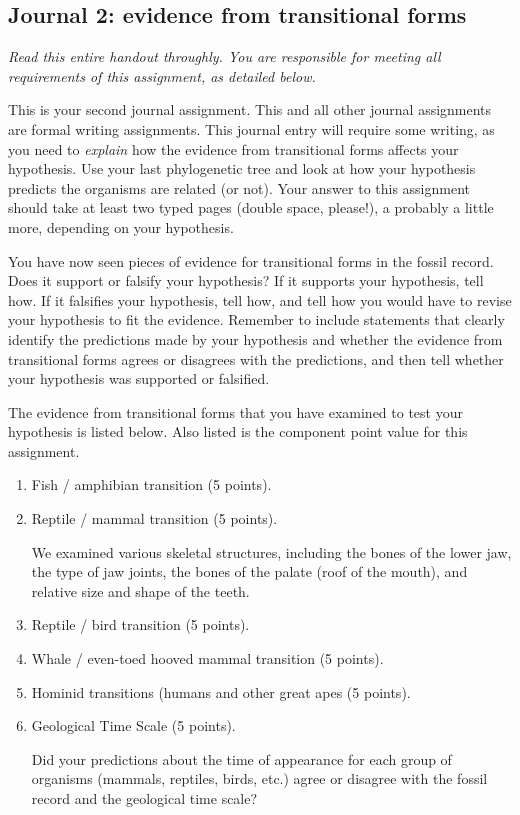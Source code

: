 \documentclass[12pt]{exam}
\begin{document}
\subsection*{Journal 2: evidence from transitional forms}

\emph{Read this entire handout throughly. You are responsible for meeting all requirements of this assignment, as detailed below.}

This is your second journal assignment. This and all other journal
assignments are formal writing assignments. This journal entry will
require some writing, as you need to \emph{explain} how the evidence
from transitional forms affects your hypothesis. Use your last
phylogenetic tree and look at how your hypothesis predicts the organisms
are related (or not). Your answer to this assignment should take at
least two typed pages (double space, please!), a probably a little more,
depending on your hypothesis.

You have now seen pieces of evidence for transitional forms in the
fossil record. Does it support or falsify your hypothesis? If it
supports your hypothesis, tell how. If it falsifies your hypothesis,
tell how, and tell how you would have to revise your hypothesis to fit
the evidence. Remember to include statements that clearly identify the
predictions made by your hypothesis and whether the evidence from
transitional forms agrees or disagrees with the predictions, and then
tell whether your hypothesis was supported or falsified.

The evidence from transitional forms that you have examined to test 
your hypothesis is listed below.  Also listed is the component point value 
for this assignment.

\begin{enumerate}


	\item Fish / amphibian transition (5 points).

	\item Reptile / mammal transition (5 points).
	
	We examined various skeletal structures, including the 
	bones of the lower jaw, the type of jaw joints, the bones of 
	the palate (roof of the mouth), and relative size and shape 
	of the teeth.

	\item Reptile / bird transition (5 points).

	\item Whale / even-toed hooved mammal transition (5 points).

	\item Hominid transitions (humans and other great apes (5 points).

	\item Geological Time Scale (5 points).
	
	Did your predictions about the time of appearance for each group 
	of organisms (mammals, reptiles, birds, etc.) agree or disagree with 
	the fossil record and the geological time scale?

\end{enumerate}
\end{document}
